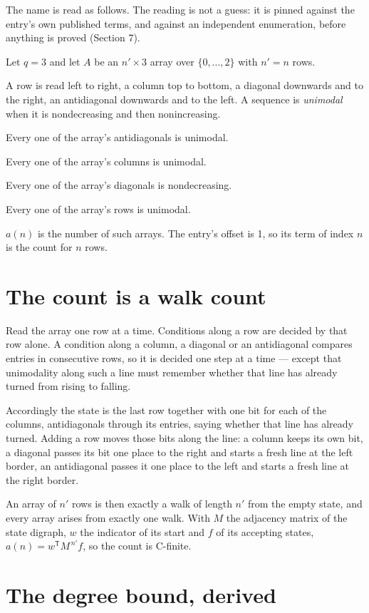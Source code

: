 \documentclass[11pt]{article}
\theoremstyle{definition}
\begin{document}
The name is read as follows. The reading is not a guess: it is pinned against the entry's own published terms, and against an independent enumeration, before anything is proved (Section 7).

Let $q = 3$ and let $A$ be an $n' \times 3$ array over $\{0,\dots,2\}$ with $n' = n$ rows.

A row is read left to right, a column top to bottom, a diagonal downwards and to the right, an antidiagonal downwards and to the left. A sequence is {\itshape unimodal} when it is nondecreasing and then nonincreasing.

Every one of the array's antidiagonals is unimodal.

Every one of the array's columns is unimodal.

Every one of the array's diagonals is nondecreasing.

Every one of the array's rows is unimodal.

$a(n)$ is the number of such arrays. The entry's offset is 1, so its term of index $n$ is the count for $n$ rows.

\section{The count is a walk count}

Read the array one row at a time. Conditions along a row are decided by that row alone. A condition along a column, a diagonal or an antidiagonal compares entries in consecutive rows, so it is decided one step at a time --- except that unimodality along such a line must remember whether that line has already turned from rising to falling.

Accordingly the state is the last row together with one bit for each of the columns, antidiagonals through its entries, saying whether that line has already turned. Adding a row moves those bits along the line: a column keeps its own bit, a diagonal passes its bit one place to the right and starts a fresh line at the left border, an antidiagonal passes it one place to the left and starts a fresh line at the right border.

An array of $n'$ rows is then exactly a walk of length $n'$ from the empty state, and every array arises from exactly one walk. With $M$ the adjacency matrix of the state digraph, $w$ the indicator of its start and $f$ of its accepting states, $a(n) = w^{\mathsf T}M^{\,n'}f$, so the count is C-finite.

\section{The degree bound, derived}
\end{document}
